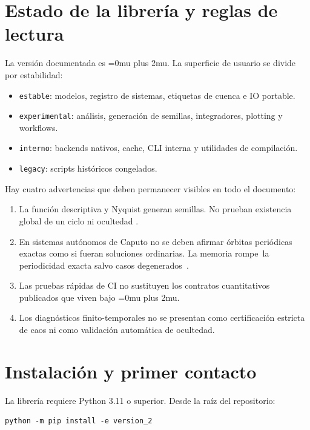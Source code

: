 \documentclass[11pt]{article}
\DeclareRobustCommand{\codepath}[1]{\begingroup\Urlmuskip=0mu plus 2mu\path{#1}\endgroup}
\newcommand{\STABLE}{\texttt{estable}}
\newcommand{\EXPERIMENTAL}{\texttt{experimental}}
\newcommand{\INTERNAL}{\texttt{interno}}
\newcommand{\LEGACY}{\texttt{legacy}}
\begin{document}
\section{Estado de la librería y reglas de lectura}

La versión documentada es \codepath{1.2.0}. La superficie de usuario se divide
por estabilidad:

\begin{itemize}
  \item \STABLE: modelos, registro de sistemas, etiquetas de cuenca e IO
  portable.
  \item \EXPERIMENTAL: análisis, generación de semillas, integradores,
  plotting y workflows.
  \item \INTERNAL: backends nativos, cache, CLI interna y utilidades de
  compilación.
  \item \LEGACY: scripts históricos congelados.
\end{itemize}

Hay cuatro advertencias que deben permanecer visibles en todo el documento:

\begin{enumerate}
  \item La función descriptiva y Nyquist generan semillas. No prueban
  existencia global de un ciclo ni ocultedad
  \cite{GenesioTesi1993,KuznetsovEtAl2017}.
  \item En sistemas autónomos de Caputo no se deben afirmar órbitas periódicas
  exactas como si fueran soluciones ordinarias. La memoria rompe~la
  periodicidad exacta salvo casos degenerados~\cite{TavazoeiHaeri2009}.
  \item Las pruebas rápidas de CI no sustituyen los contratos cuantitativos
  publicados que viven bajo \codepath{validation/}.
  \item Los diagnósticos finito-temporales no se presentan como certificación
  estricta de caos ni como validación automática de ocultedad.
\end{enumerate}

\section{Instalación y primer contacto}

La librería requiere Python 3.11 o superior. Desde la raíz del repositorio:

\begin{verbatim}
python -m pip install -e version_2
\end{verbatim}
\end{document}
